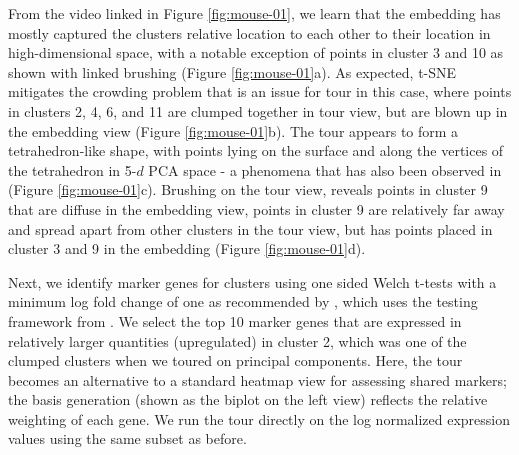 \documentclass[article,notitle]{jdssv}
\begin{document}
From the video linked in Figure \ref{fig:mouse-01}, we learn that the embedding has mostly captured the
clusters relative location to each other to their location in high-dimensional space, with a notable exception of points in cluster 3 and 10 as shown with
linked brushing (Figure \ref{fig:mouse-01}a). As expected, t-SNE mitigates the crowding problem that is
an issue for tour in this case, where points in clusters 2, 4, 6, and 11 are
clumped together in tour view, but are blown up in the embedding view (Figure \ref{fig:mouse-01}b).
The tour appears to form a tetrahedron-like shape, with points lying on
the surface and along the vertices of the tetrahedron in 5-\(d\) PCA space -
a phenomena that has also been observed in \citet{Korem2015-af}
(Figure \ref{fig:mouse-01}c). Brushing on
the tour view, reveals points in cluster 9 that are diffuse in the embedding
view, points in cluster 9 are relatively far away and spread apart from other
clusters in the tour view, but has points placed in cluster 3 and 9 in the embedding
(Figure \ref{fig:mouse-01}d).

Next, we identify marker genes for clusters using one sided Welch t-tests with
a minimum log fold change of one as recommended by \citet{Amezquita2020-at}, which
uses the testing framework from \citet{McCarthy2009-qx}. We select the top 10 marker
genes that are expressed in relatively larger quantities (upregulated) in cluster 2, which was one of the clumped clusters
when we toured on principal components. Here, the tour becomes an alternative
to a standard heatmap view for assessing shared markers; the basis
generation (shown as the biplot on the left view) reflects the relative
weighting of each gene. We run the tour directly on the
log normalized expression values using the same subset as before.
\end{document}
